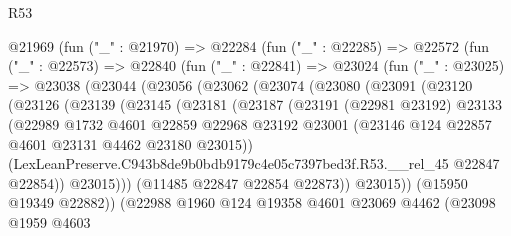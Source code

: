 \begin{lexlean}{R53}
\begin{coremodule}
        @21969
          (fun ("_" : @21970) =>
          @22284
            (fun ("_" : @22285) =>
            @22572
              (fun ("_" : @22573) =>
              @22840
                (fun ("_" : @22841) =>
                @23024
                  (fun ("_" : @23025) =>
                  @23038
                    (@23044
                      (@23056
                        (@23062
                          (@23074
                            (@23080
                              (@23091
                                (@23120
                                  (@23126
                                    (@23139
                                      (@23145
                                        (@23181
                                          (@23187
                                            (@23191
                                              (@22981 @23192)
                                              @23133
                                              (@22989
                                                @1732
                                                @4601
                                                @22859
                                                @22968
                                                @23192
                                                @23001
                                                (@23146
                                                  @124
                                                  @22857
                                                  @4601
                                                  @23131
                                                  @4462
                                                  @23180
                                                  @23015))
                                              (LexLeanPreserve.C943b8de9b0bdb9179c4e05c7397bed3f.R53.__rel_45
                                                @22847
                                                @22854))
                                            @23015)))
                                      (@11485 @22847 @22854 @22873))
                                    @23015))
                                (@15950 @19349 @22882))
                              (@22988
                                @1960
                                @124
                                @19358
                                @4601
                                @23069
                                @4462
                                (@23098
                                  @1959
                                  @4603

\end{coremodule}
\end{lexlean}
